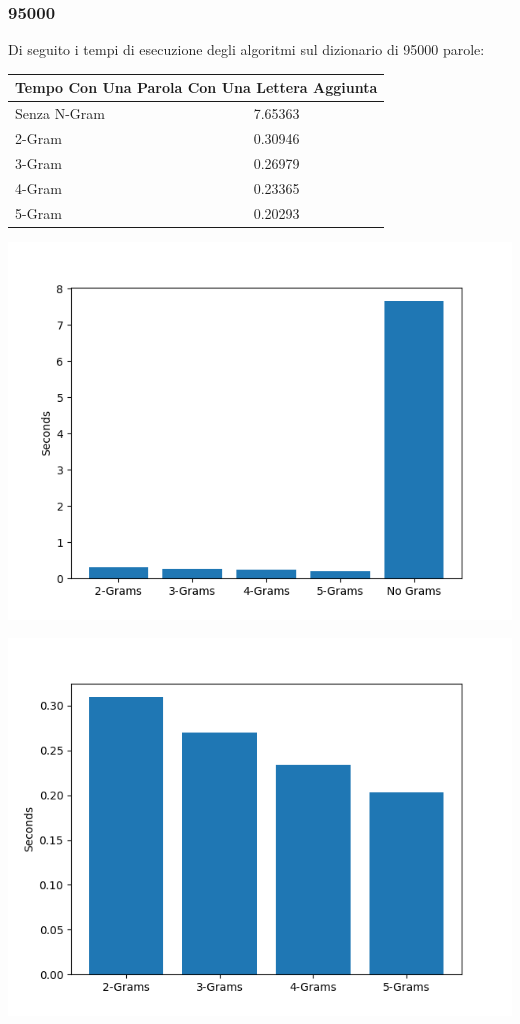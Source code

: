 \documentclass{article}
\begin{document}
\subsubsection{95000}
Di seguito i tempi di esecuzione degli algoritmi sul dizionario di 95000 parole:
\medskip

\begin{tabular}{ |p{3cm}||p{3.5cm}|  }
 \hline
 \multicolumn{2}{|c|}{Tempo Con Una Parola Con Una Lettera Aggiunta} \\
\hline
 Senza N-Gram  &  7.65363\\\hline
 2-Gram &  0.30946   \\\hline
 3-Gram & 0.26979 \\\hline
 4-Gram & 0.23365\\\hline
 5-Gram & 0.20293  \\
 \hline
\end{tabular}

\includegraphics[scale=0.5]{img/LetteraAggiunta_95000_parole.png}

\includegraphics[scale=0.5]{img/LetteraAggiuntaSoloGram_95000_parole.png}
\end{document}
